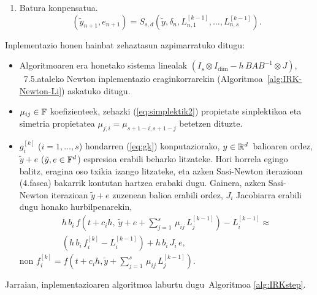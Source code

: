 \begin{enumerate}
\begin{enumerate}
\item Batura konpensatua.
\begin{equation*}
(\tilde y_{n+1},e_{n+1}) = S_{s,d}(\tilde y, \delta_n, L_{n,1}^{[k-1]}, \ldots, L_{n,s}^{[k-1]}).
\end{equation*}

\end{enumerate}

\end{enumerate}

 
Inplementazio honen hainbat zehaztasun azpimarratuko ditugu:
\begin{itemize}

\item Algoritmoaren era honetako sistema linealak $(I_s \otimes I_\dim  - h \, B A B^{-1} \otimes J )$, ~7.5.ataleko Newton inplementazio eraginkorrarekin  (Algoritmoa~\ref{alg:IRK-Newton-Li}) askatuko ditugu.

\item $\mu_{i j} \in \mathbb{F}$ koefizienteek, zehazki (\ref{eq:simplektik2}) propietate sinplektikoa  eta simetria propietatea $\mu_{j, i} = \mu_{s+1-i,s+1-j}$  betetzen dituzte.

\item $g_i^{[k]}$  ($i=1,\dots,s$) hondarren (\ref{eq:gk}) konputaziorako, $y\in \mathbb{R}^d$~balioaren ordez, $\tilde y + e$ ($\tilde y, e \in \mathbb{F}^d$) espresioa erabili beharko litzateke. Hori horrela egingo balitz, eragina oso txikia izango litzateke, eta azken Sasi-Newton iterazioan (4.fasea) bakarrik kontutan hartzea erabaki dugu. Gainera, azken Sasi-Newton iterazioan $\tilde y + e$ zuzenean balioa erabili ordez, $J_i$ Jacobiarra erabili dugu honako hurbilpenarekin,
\begin{gather*}
 h \, b_i\, f\left(t+c_i h, \ \tilde y + e +\sum_{j=1}^{s}\, \mu_{ij}\, L_{j}^{[k-1]}\right)  -L_{i}^{[k-1]} \approx \\
\left(h \, b_i\, f_i^{[k]} -L_{i}^{[k-1]} \right) + h\, b_i \, J_i \, e,
\end{gather*}
%
non $f_i^{[k]}=f\left(t+c_i h,  \tilde y +\sum_{j=1}^{s}\, \mu_{ij}\, L_{j}^{[k-1]}\right)$.

\end{itemize}

Jarraian, inplementazioaren algoritmoa laburtu dugu~Algoritmoa \ref{alg:IRKstep}.

